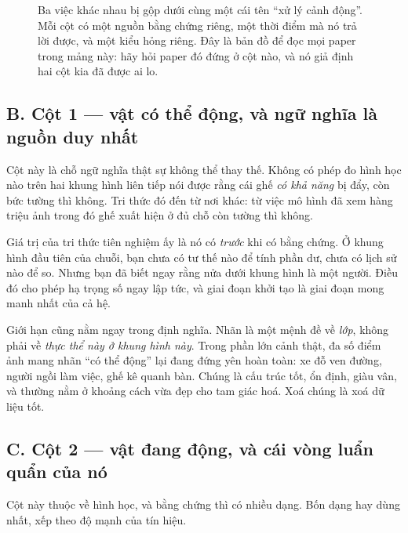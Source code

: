 \documentclass[../../deep_learning.tex]{subfiles}
\begin{document}
\begin{figure}[H]
{}
\caption{Ba việc khác nhau bị gộp dưới cùng một cái tên ``xử lý cảnh động''. Mỗi cột có một nguồn bằng chứng riêng, một thời điểm mà nó trả lời được, và một kiểu hỏng riêng. Đây là bản đồ để đọc mọi paper trong mảng này: hãy hỏi paper đó đứng ở cột nào, và nó giả định hai cột kia đã được ai lo.}
\label{fig:f33-baviec}
\end{figure}

\subsection{B. Cột 1 --- vật có thể động, và ngữ nghĩa là nguồn duy nhất}
Cột này là chỗ ngữ nghĩa thật sự không thể thay thế. Không có phép đo hình học nào trên hai khung hình liên tiếp nói được rằng cái ghế \emph{có khả năng} bị đẩy, còn bức tường thì không. Tri thức đó đến từ nơi khác: từ việc mô hình đã xem hàng triệu ảnh trong đó ghế xuất hiện ở đủ chỗ còn tường thì không.

Giá trị của tri thức tiên nghiệm ấy là nó có \emph{trước} khi có bằng chứng. Ở khung hình đầu tiên của chuỗi, bạn chưa có tư thế nào để tính phần dư, chưa có lịch sử nào để so. Nhưng bạn đã biết ngay rằng nửa dưới khung hình là một người. Điều đó cho phép hạ trọng số ngay lập tức, và giai đoạn khởi tạo là giai đoạn mong manh nhất của cả hệ.

Giới hạn cũng nằm ngay trong định nghĩa. Nhãn là một mệnh đề về \emph{lớp}, không phải về \emph{thực thể này ở khung hình này}. Trong phần lớn cảnh thật, đa số điểm ảnh mang nhãn ``có thể động'' lại đang đứng yên hoàn toàn: xe đỗ ven đường, người ngồi làm việc, ghế kê quanh bàn. Chúng là cấu trúc tốt, ổn định, giàu vân, và thường nằm ở khoảng cách vừa đẹp cho tam giác hoá. Xoá chúng là xoá dữ liệu tốt.

\subsection{C. Cột 2 --- vật đang động, và cái vòng luẩn quẩn của nó}
Cột này thuộc về hình học, và bằng chứng thì có nhiều dạng. Bốn dạng hay dùng nhất, xếp theo độ mạnh của tín hiệu.
\end{document}
